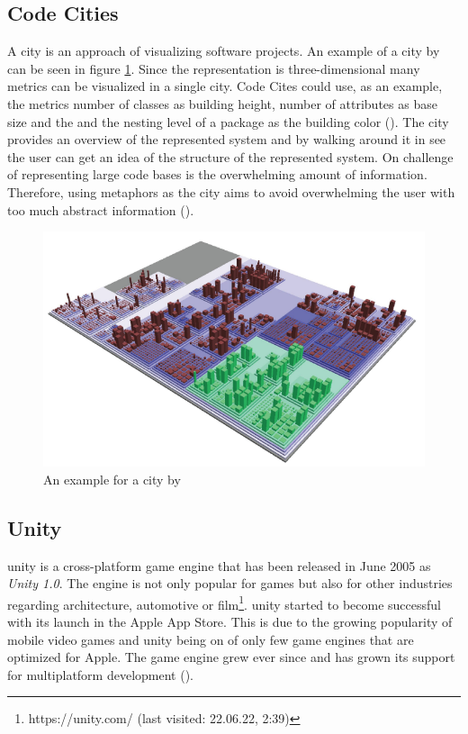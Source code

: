 \subsection{Code Cities}
A \gls{city} is an approach of visualizing software projects.
An example of a \gls{city} by \cite{wettel2007visualizing} can be seen in figure \ref{fig:city_example}.
Since the representation is three-dimensional many metrics can be visualized in a single \gls{city}.
Code Cites could use, as an example, the metrics number of classes as building height, number of attributes as base size and the and the nesting level of a package as the building color (\cite{wettel2008visual}).
The \gls{city} provides an overview of the represented system and by walking around it in \gls{see} the user can get an idea of the structure of the represented system.
On challenge of representing large code bases is the overwhelming amount of information.
Therefore, using metaphors as the \gls{city} aims to avoid overwhelming the user with too much abstract information (\cite{Wettel2008}).
\begin{figure}[htb]
    \centering
    \includegraphics[width=1\textwidth]{Fundamentals/img/code_city.png}
    \caption{An example for a \gls{city} by \cite{wettel2007visualizing}}
    \label{fig:city_example}
\end{figure}

\subsection{Unity}
\gls{unity} is a cross-platform game engine that has been released in June 2005 as \textit{Unity 1.0}.
The engine is not only popular for games but also for other industries regarding architecture, automotive or film\footnote{https://unity.com/ (last visited: 22.06.22, 2:39)}.
\gls{unity} started to become successful with its launch in the Apple App Store. 
This is due to the growing popularity of mobile video games and \gls{unity} being on of only few game engines that are optimized for Apple.
The game engine grew ever since and has grown its support for multiplatform development (\cite{nicoll2019unity}).


